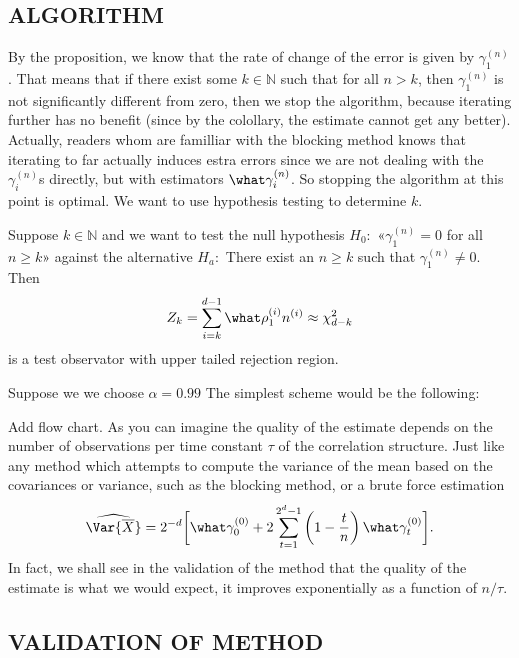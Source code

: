 \documentclass[11pt,english,a4paper]{article}
\begin{document}
\subsection*{\uppercase{Algorithm}}
By the proposition, we know that the rate of change of the error is given by $\gamma_1^{(n)}$. That means that if there exist some $k \in \mathbb{N}$ such that for all $n > k$, then $\gamma_1^{(n)}$ is not significantly different from zero, then we stop the algorithm, because iterating further has no benefit (since by the colollary, the estimate cannot get any better). Actually, readers whom are familliar with the blocking method knows that iterating to far actually induces estra errors since we are not dealing with the $\gamma_i^{(n)}$s directly, but with estimators $\what \gamma_i^{(n)}$. So stopping the algorithm at this point is optimal. We want to use hypothesis testing to determine $k$.
\begin{theorem}
Suppose $k \in \mathbb{N}$ and we want to test the null hypothesis $H_0:$ «$\gamma_1^{(n)} = 0$ for all $n \geq k$» against the alternative $H_a:$ There exist an $n \geq k$ such that $\gamma_1^{(n)} \neq 0$. Then 
\[
Z_k = \sum_{i=k}^{d-1} \what \rho_1^{(i)}n^{(i)} \approx \chi^2_{d-k}
\]
is a test observator with upper tailed rejection region.
\end{theorem}

Suppose we we choose $\alpha = 0.99$ The simplest scheme would be the following:

Add flow chart. As you can imagine the quality of the estimate depends on the number of observations per time constant $\tau$ of the correlation structure. Just like any method which attempts to compute the variance of the mean based on the covariances or variance, such as the blocking method, or a brute force estimation
\[
\widehat{\Var{\overline X}} = 2^{-d} \bigg[ \what\gamma_0^{(0)} + 2 \sum_{t=1}^{2^d - 1} \left( 1 - \frac{t}{n} \right)\what \gamma_t^{(0)} \bigg].
\]
In fact, we shall see in the validation of the method that the quality of the estimate is what we would expect, it improves exponentially as a function of $n/\tau$.
\subsection*{\uppercase{Validation of method}}
\end{document}

